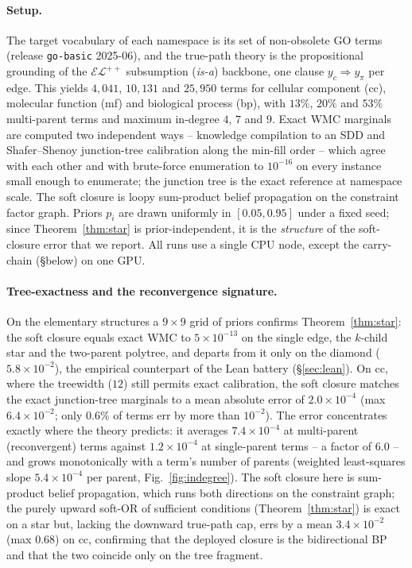 \documentclass[anon]{nesy2026}
\begin{document}
\paragraph{Setup.}
The target vocabulary of each namespace is its set of non-obsolete GO terms (release
\texttt{go-basic} 2025-06), and the true-path theory is the propositional grounding of the
$\mathcal{EL}^{++}$ subsumption (\emph{is-a}) backbone, one clause $y_c\!\Rightarrow\!y_\pi$
per edge. This yields $4{,}041$, $10{,}131$ and $25{,}950$ terms for cellular component (cc),
molecular function (mf) and biological process (bp), with $13\%$, $20\%$ and $53\%$
multi-parent terms and maximum in-degree $4$, $7$ and $9$. Exact WMC marginals are computed
two independent ways -- knowledge compilation to an SDD \citep{darwiche2011sdd} and
Shafer--Shenoy junction-tree calibration along the min-fill order -- which agree with each
other and with brute-force enumeration to $10^{-16}$ on every instance small enough to
enumerate; the junction tree is the exact reference at namespace scale. The soft closure is
loopy sum-product belief propagation on the constraint factor graph. Priors $p_i$ are drawn
uniformly in $[0.05,0.95]$ under a fixed seed; since Theorem~\ref{thm:star} is
prior-independent, it is the \emph{structure} of the soft-closure error that we report. All
runs use a single CPU node, except the carry-chain (\S below) on one GPU.

\paragraph{Tree-exactness and the reconvergence signature.}
On the elementary structures a $9\times9$ grid of priors confirms Theorem~\ref{thm:star}: the
soft closure equals exact WMC to $5\times10^{-13}$ on the single edge, the $k$-child star and
the two-parent polytree, and departs from it only on the diamond ($5.8\times10^{-2}$), the
empirical counterpart of the Lean battery (\S\ref{sec:lean}). On cc, where the treewidth ($12$)
still permits exact calibration, the soft closure matches the exact junction-tree marginals to
a mean absolute error of $2.0\times10^{-4}$ (max $6.4\times10^{-2}$; only $0.6\%$ of terms err
by more than $10^{-2}$). The error concentrates exactly where the theory predicts: it averages
$7.4\times10^{-4}$ at multi-parent (reconvergent) terms against $1.2\times10^{-4}$ at
single-parent terms -- a factor of $6.0$ -- and grows monotonically with a term's number of
parents (weighted least-squares slope $5.4\times10^{-4}$ per parent, Fig.~\ref{fig:indegree}).
The soft closure here is sum-product belief propagation, which runs both directions on the
constraint graph; the purely upward soft-OR of sufficient conditions (Theorem~\ref{thm:star})
is exact on a star but, lacking the downward true-path cap, errs by a mean $3.4\times10^{-2}$
(max $0.68$) on cc, confirming that the deployed closure is the bidirectional BP and that the
two coincide only on the tree fragment.
\end{document}
